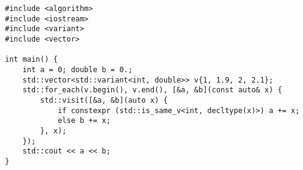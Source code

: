 \begin{lstlisting}[title=\href{https://godbolt.org/z/5T7nTx}{\texttt{godbolt.org/z/5T7nTx}}]
#include <algorithm>
#include <iostream>
#include <variant>
#include <vector>

int main() {
    int a = 0; double b = 0.;
    std::vector<std::variant<int, double>> v{1, 1.9, 2, 2.1};
    std::for_each(v.begin(), v.end(), [&a, &b](const auto& x) {
        std::visit([&a, &b](auto x) {
            if constexpr (std::is_same_v<int, decltype(x)>) a += x;
            else b += x;
        }, x);
    });
    std::cout << a << b;
}
\end{lstlisting}
